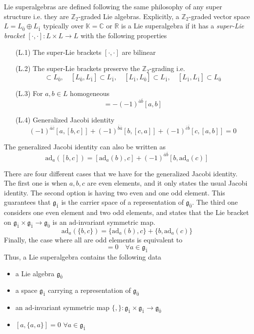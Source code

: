 \documentclass[a4paper,12pt]{article}
\numberwithin{equation}{section}
\numberwithin{thm}{section}
\numberwithin{exm}{section}
\newcommand{\ad}{\mathrm{ad}}
\newcommand{\Z}{{\mathbb Z}}
\newcommand{\C}{{\mathbb C}}
\newcommand{\R}{{\mathbb R}}
\newcommand{\<}{{\langle}}
\renewcommand{\>}{{\rangle}}
\newcommand{\mf}{\mathfrak}
\newcommand{\ev}{{\bar 0}}
\newcommand{\od}{{\bar 1}}
\begin{document}
Lie superalgebras are defined following the same philosophy of any super structure i.e. they are $\Z_2$-graded Lie algebras. Explicitly, a $\Z_2$-graded vector space $L = L_\ev \oplus L_\od$ typically over $\mathbb{K}=\C$ or $\R$ is a Lie superalgebra if it has a {\it super-Lie bracket} $[\cdot,\cdot]:L\times L\rightarrow L$ with the following properties
	\begin{itemize}
	\item[(L.1)] The super-Lie brackets $[\cdot,\cdot]$ are bilinear
	\item[(L.2)] The super-Lie brackets preserve the $\Z_2$-grading i.e.
		\begin{equation}
		[L_\ev,L_\ev]\subset L_\ev,\quad [L_\ev,L_\od]\subset L_\od,\quad [L_\od,L_\ev]\subset L_\od,\quad [L_\od,L_\od]\subset L_\ev
		\end{equation}
	\item[(L.3)] For $a,b\in L$ homogeneous
		\begin{equation}
		[b,a] =  -(-1)^{\bar a\bar b} [a,b]
		\end{equation}
	\item[(L.4)] Generalized Jacobi identity
		\begin{equation}
		(-1)^{\bar a\bar c}[a,[b,c]] + (-1)^{\bar b\bar a}[b,[c,a]] + (-1)^{\bar c\bar b} [c,[a,b]] = 0
		\end{equation}
	\end{itemize}
The generalized Jacobi identity can also be written as
	\begin{equation}
	\ad_a([b,c]) = [\ad_a(b),c] + (-1)^{\bar a\bar b}[b,\ad_a(c)]
	\end{equation}

There are four different cases that we have for the generalized Jacobi identity. The first one is when $a,b,c$ are even elements, and it only states the usual Jacobi identity. The second option is having two even and one odd element. This guarantees that $\mf g_\od$ is the carrier space of a representation of $\mf g_\ev$. The third one considers one even element and two odd elements, and states that the Lie bracket on $\mf g_\od\times \mf g_\od\rightarrow \mf g_\ev$ is an $\ad$-invariant symmetric map.
	\begin{equation}
	\ad_a(\{b,c\}) = \{\ad_a(b),c\} + \{b,\ad_a(c)\}
	\end{equation}
Finally, the case where all are odd elements is equivalent to
	\begin{equation}
	[a,\{a, a\}] = 0 \quad\forall a\in \mf g_\od
	\end{equation}
Thus, a Lie superalgebra contains the following data
	\begin{itemize}
	\item a Lie algebra $\mf g_\ev$
	\item a space $\mf g_\od$ carrying a representation of $\mf g_\ev$
	\item an $\ad$-invariant symmetric map $\{,\}:\mf g_\od\times\mf g_\od \rightarrow \mf g_\ev$
	\item $[a,\{a,a\}] = 0$ $\forall a\in \mf g_\od$
	\end{itemize}
\end{document}
